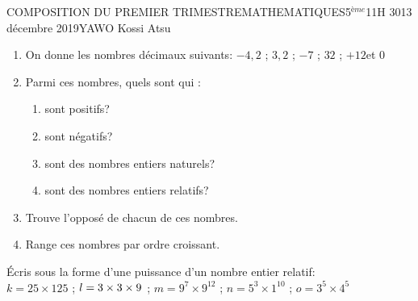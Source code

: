 \documentclass[12pt,a4paper]{book}
\newcommand{\prof}{YAWO Kossi Atsu}
\newcommand{\matiere}{MATHEMATIQUES}
\newcommand{\classe}{5$^{ème}$}
\begin{document}
\begin{devoir}{COMPOSITION DU PREMIER TRIMESTRE}{\matiere}{\classe}{1}{1H 30}{13 décembre 2019}{\prof}
\begin{exo}[7,5]
\begin{multicols}{2}
\begin{enumerate}
\item On donne les nombres décimaux suivants: $-4,2$ \qquad ; \qquad $3,2$ \qquad ; \qquad $-7$ \qquad ; \qquad $32$ \qquad ; \qquad $+12$\qquad et \qquad $0$
\item Parmi ces nombres, quels sont qui : 
\begin{enumerate}
\item sont positifs?
\item sont négatifs?
\item sont des nombres entiers naturels?
\item sont des nombres entiers relatifs?
\end{enumerate} 
\item Trouve l'opposé de chacun de ces nombres.
\item Range ces nombres par ordre croissant.
\end{enumerate}
\end{multicols}
\end{exo}

\vspace{0.5cm}
\begin{exo}[2.5]
Écris sous la forme d'une puissance d'un nombre entier relatif:\\
$k=25\times125$ \qquad; \qquad $l=3\times3\time27\times9$ \qquad; \qquad $m=9^7\times9^{12}$ \qquad; \qquad $n=5^3\times1^{10}$ \qquad; \qquad $o=3^5\times4^5$
\end{exo}

\tableofcompetences
\end{devoir}
\end{document}
